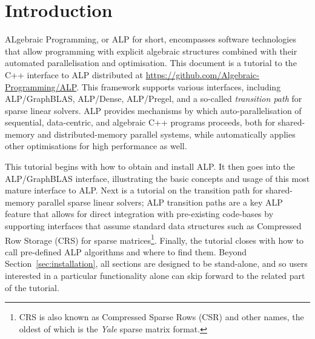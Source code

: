 \section{Introduction}\label{sec:introduction}

ALgebraic Programming, or ALP for short, encompasses software technologies that allow programming with explicit algebraic structures combined with their automated parallelisation and optimisation.
This document is a tutorial to the C++ interface to ALP distributed at \url{https://github.com/Algebraic-Programming/ALP}.
This framework supports various interfaces, including ALP/GraphBLAS, ALP/Dense, ALP/Pregel, and a so-called \emph{transition path} for sparse linear solvers.
ALP provides mechanisms by which auto-parallelisation of sequential, data-centric, and algebraic C++ programs proceeds, both for shared-memory and distributed-memory parallel systems,
while automatically applies other optimisations for high performance as well.


This tutorial begins with how to obtain and install ALP.
It then goes into the ALP/GraphBLAS interface, illustrating the basic concepts and usage of this most mature interface to ALP.
Next is a tutorial on the transition path for shared-memory parallel sparse linear solvers; ALP transition paths are a key ALP feature that allows for direct integration with pre-existing code-bases by supporting interfaces that assume standard data structures such as Compressed Row Storage (CRS) for sparse matrices\footnote{CRS is also known as Compressed Sparse Rows (CSR) and other names, the oldest of which is the \emph{Yale} sparse matrix format.}.
Finally, the tutorial closes with how to call pre-defined ALP algorithms and where to find them.
Beyond Section~\ref{sec:installation}, all sections are designed to be stand-alone, and so users interested in a particular functionality alone can skip forward to the related part of the tutorial.

\clearpage

